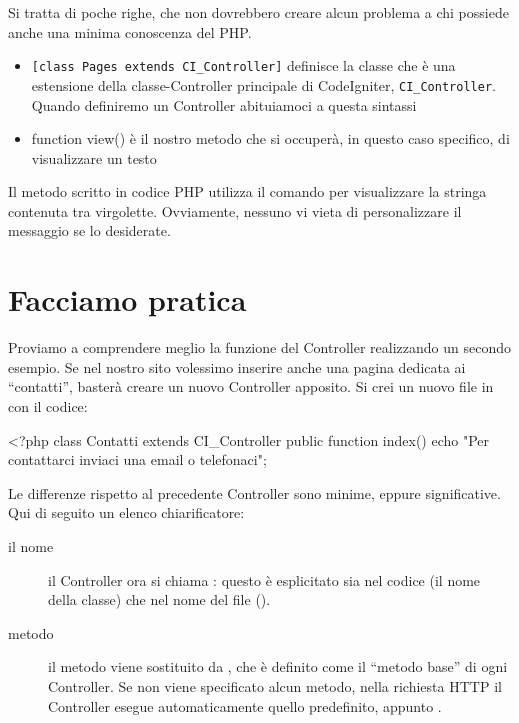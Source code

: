Si tratta di poche righe, che non dovrebbero creare alcun problema a chi possiede anche una minima conoscenza del \ac{PHP}.

\begin{itemize}
\item \verb|[class Pages extends CI_Controller]| definisce la classe  che è una estensione della classe-Controller principale di CodeIgniter, \verb|CI_Controller|. Quando definiremo un Controller abituiamoci a questa sintassi
\item function view() è il nostro metodo che si occuperà, in questo caso specifico, di visualizzare un testo
\end{itemize}

Il metodo  scritto in codice \ac{PHP} utilizza il comando  per visualizzare la stringa contenuta tra virgolette. Ovviamente, nessuno vi vieta di personalizzare il messaggio se lo desiderate. 

\section*{Facciamo pratica}
Proviamo a comprendere meglio la funzione del Controller realizzando un secondo esempio. Se nel nostro sito volessimo inserire anche una pagina dedicata ai ``contatti'', basterà creare un nuovo Controller apposito. Si crei un nuovo file  in  con il codice:

\begin{code}
<?php
class Contatti extends CI_Controller {
	public function index()
	{
		echo "Per contattarci inviaci una email o telefonaci";
	}
}
\end{code}

Le differenze rispetto al precedente Controller sono minime, eppure significative. Qui di seguito un elenco chiarificatore:

\begin{description}
\item[il nome] il Controller ora si chiama : questo è esplicitato sia nel codice (il nome della classe) che nel nome del file ().
\item[metodo] il metodo  viene sostituito da , che è definito come il ``metodo base'' di ogni Controller. Se non viene specificato alcun metodo, nella richiesta \ac{HTTP} il Controller esegue automaticamente quello predefinito, appunto .
\end{description}

